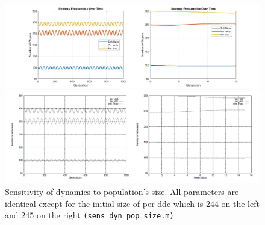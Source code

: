\begin{figure}[ht!]
	\centering
	\begin{minipage}{1\textwidth}
		\includegraphics[width=1\linewidth]{fit_plots_theoretical/sensitivity_to_population_size}
		
		
	\end{minipage}
	\begin{minipage}{1\textwidth}
		\includegraphics[width=1\linewidth]{sens_popsize}
	\end{minipage}
	\caption{Sensitivity of dynamics to population's size. All parameters are identical except
		for the initial size of per ddc which is 244 on the left and 245 on the right \texttt{(sens\_dyn\_pop\_size.m)}}
\end{figure}

